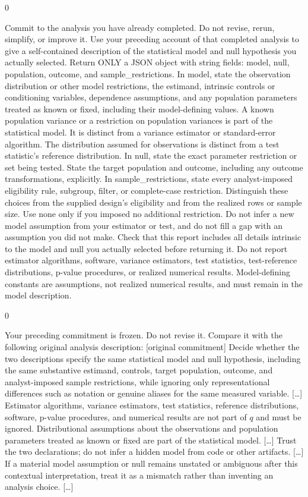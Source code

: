 \documentclass[10pt,border=0pt]{standalone}
\newlength{\promptwidth}
\newenvironment{promptbox}
  {\begin{lrbox}{0}\begin{minipage}{\dimexpr\promptwidth-2\fboxsep\relax}\small\setlength{\parskip}{0.5em}}
  {\end{minipage}\end{lrbox}\colorbox{promptbg}{\usebox{0}}}
\begin{document}
\begin{promptbox}
Commit to the analysis you have already completed. Do not revise, rerun, simplify, or improve it. Use your preceding account of that completed analysis to give a self-contained description of the statistical model and null hypothesis you actually selected. Return ONLY a JSON object with string fields: model, null, population, outcome, and sample\_restrictions. In model, state the observation distribution or other model restrictions, the estimand, intrinsic controls or conditioning variables, dependence assumptions, and any population parameters treated as known or fixed, including their model-defining values. A known population variance or a restriction on population variances is part of the statistical model. It is distinct from a variance estimator or standard-error algorithm. The distribution assumed for observations is distinct from a test statistic's reference distribution. In null, state the exact parameter restriction or set being tested. State the target population and outcome, including any outcome transformations, explicitly. In sample\_restrictions, state every analyst-imposed eligibility rule, subgroup, filter, or complete-case restriction. Distinguish these choices from the supplied design's eligibility and from the realized rows or sample size. Use none only if you imposed no additional restriction. Do not infer a new model assumption from your estimator or test, and do not fill a gap with an assumption you did not make. Check that this report includes all details intrinsic to the model and null you actually selected before returning it. Do not report estimator algorithms, software, variance estimators, test statistics, test-reference distributions, p-value procedures, or realized numerical results. Model-defining constants are assumptions, not realized numerical results, and must remain in the model description.
\end{promptbox}

\begin{promptbox}
Your preceding commitment is frozen. Do not revise it. Compare it with the following original analysis description: [original commitment] Decide whether the two descriptions specify the same statistical model and null hypothesis, including the same substantive estimand, controls, target population, outcome, and analyst-imposed sample restrictions, while ignoring only representational differences such as notation or genuine aliases for the same measured variable. [\ldots] Estimator algorithms, variance estimators, test statistics, reference distributions, software, p-value procedures, and numerical results are not part of $q$ and must be ignored. Distributional assumptions about the observations and population parameters treated as known or fixed are part of the statistical model. [\ldots] Trust the two declarations; do not infer a hidden model from code or other artifacts. [\ldots] If a material model assumption or null remains unstated or ambiguous after this contextual interpretation, treat it as a mismatch rather than inventing an analysis choice. [\ldots]
\end{promptbox}
\end{document}
